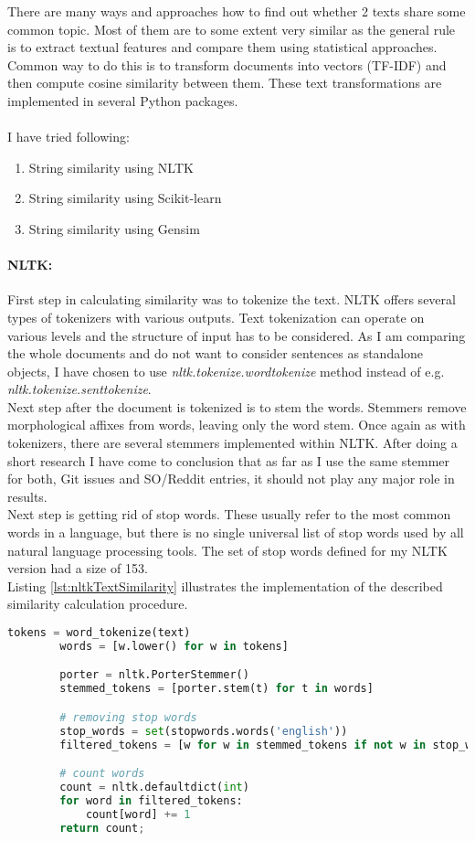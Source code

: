 There are many ways and approaches how to find out whether 2 texts share some common topic. Most of them are to some extent very similar as the general rule is to extract textual features and compare them using statistical approaches. Common way to do this is to transform documents into vectors (TF-IDF) and then compute cosine similarity between them. These text transformations are implemented in several Python packages.\\
\\
I have tried following:
\begin{enumerate}
\item String similarity using NLTK
\item String similarity using Scikit-learn
\item String similarity using Gensim
\end{enumerate}

\paragraph{NLTK:}First step in calculating similarity was to tokenize the text. NLTK offers several types of tokenizers with various outputs. Text tokenization can operate on various levels and the structure of input has to be considered. As I am comparing the whole documents and do not want to consider sentences as standalone objects, I have chosen to use \textit{nltk.tokenize.wordtokenize} method instead of e.g. \textit{nltk.tokenize.senttokenize}.\\
Next step after the document is tokenized is to stem the words. Stemmers remove morphological affixes from words, leaving only the word stem. Once again as with tokenizers, there are several stemmers implemented within NLTK. After doing a short research I have come to conclusion that as far as I use the same stemmer for both, Git issues and SO/Reddit entries, it should not play any major role in results.\\
Next step is getting rid of stop words. These usually refer to the most common words in a language, but there is no single universal list of stop words used by all natural language processing tools. The set of stop words defined for my NLTK version had a size of 153.\\
Listing \ref{lst:nltkTextSimilarity} illustrates the implementation of the described similarity calculation procedure.

\begin{lstlisting}[caption={Text similarity implementation with NLTK},label={lst:nltkTextSimilarity},language=Python]
		tokens = word_tokenize(text)
		words = [w.lower() for w in tokens]

		porter = nltk.PorterStemmer()
		stemmed_tokens = [porter.stem(t) for t in words]

		# removing stop words
		stop_words = set(stopwords.words('english'))
		filtered_tokens = [w for w in stemmed_tokens if not w in stop_words]

		# count words
		count = nltk.defaultdict(int)
		for word in filtered_tokens:
			count[word] += 1
		return count;
\end{lstlisting}

